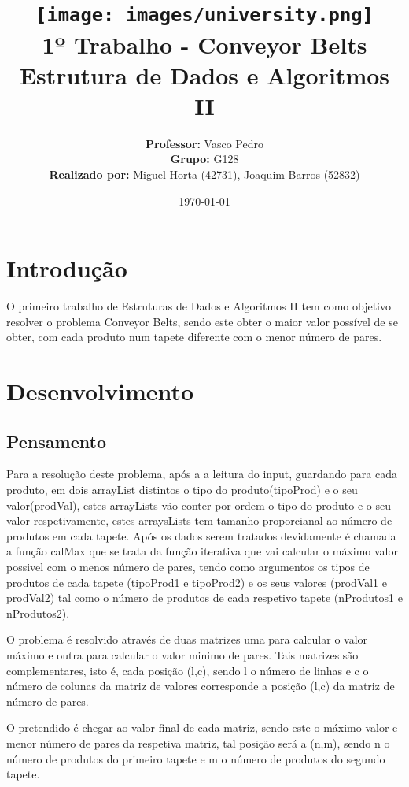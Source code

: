 \documentclass[11pt]{article}
\title
{
    \texttt{[image: images/university.png]}
    \\[0.1cm]
    \textbf{1º Trabalho - Conveyor Belts} \\
    Estrutura de Dados e Algoritmos II
}
\author
{
    \textbf{Professor:} Vasco Pedro \\
    \textbf{Grupo:} G128 \\
    \textbf{Realizado por:} Miguel Horta (42731), Joaquim Barros (52832)
}
\date{\today}
\begin{document}
\maketitle
\section{Introdução}

\hspace{0,5cm} O primeiro trabalho de Estruturas de Dados e Algoritmos II tem como objetivo resolver o problema Conveyor Belts, sendo este obter o maior valor possível de se obter, com cada produto num tapete diferente com o menor número de pares.

\section{Desenvolvimento}

\subsection{Pensamento}

\hspace{0,5cm}Para a resolução deste problema, após a a leitura do input, guardando para cada produto, em dois arrayList distintos o tipo do produto(tipoProd) e o seu valor(prodVal), estes arrayLists vão conter por ordem o tipo do produto e o seu valor respetivamente, estes arraysLists tem tamanho proporcianal ao número de produtos em cada tapete. Após os dados serem tratados devidamente é chamada a função calMax que se trata da função iterativa que vai calcular o máximo valor possivel com o menos número de pares, tendo como argumentos os tipos de produtos de cada tapete (tipoProd1 e tipoProd2) e os seus valores (prodVal1 e prodVal2) tal como o número de produtos de cada respetivo tapete (nProdutos1 e nProdutos2).

O problema é resolvido através de duas matrizes uma para calcular o valor máximo e outra para calcular o valor minimo de pares. Tais matrizes são complementares, isto é, cada posição (l,c), sendo l o número de linhas e c o número de colunas da matriz de valores corresponde a posição (l,c) da matriz de número de pares.

O pretendido é chegar ao valor final de cada matriz, sendo este o máximo valor e menor número de pares da respetiva matriz, tal posição será a (n,m), sendo n o número de produtos do primeiro tapete e m o número de produtos do segundo tapete. 
\end{document}
